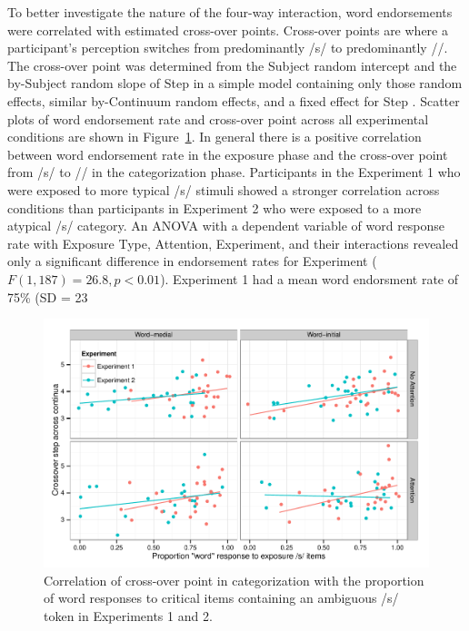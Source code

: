 To better investigate the nature of the four-way interaction, word endorsements were correlated with estimated cross-over points.  
Cross-over points are where a participant's perception switches from predominantly /s/ to predominantly /\textesh/.
The cross-over point was determined from the Subject random intercept and the by-Subject random slope of Step in a simple model containing only those random effects, similar by-Continuum random effects, and a fixed effect for Step \citep{Kleber2012}. 
Scatter plots of word endorsement rate and cross-over point across all experimental conditions are shown in Figure~\ref{fig:exp12xover}.
In general there is a positive correlation between word endorsement rate in the exposure phase and the cross-over point from /s/ to /\textesh/ in the categorization phase.
Participants in the Experiment 1 who were exposed to more typical /s/ stimuli showed a stronger correlation across conditions than participants in Experiment 2 who were exposed to a more atypical /s/ category.
An ANOVA with a dependent variable of word response rate with Exposure Type, Attention, Experiment, and their interactions revealed only a significant difference in endorsement rates for Experiment ($F(1, 187) = 26.8, p < 0.01$).  
Experiment 1 had a mean word endorsment rate of 75\% (SD = 23%

\begin{figure}[!ht]
\caption{Correlation of cross-over point in categorization with the proportion of word responses to critical items containing an ambiguous /s/ token in Experiments 1 and 2.}\label{fig:exp12xover}
\begin{center}
\includegraphics[width=\textwidth]{graphs/exp12_xoverwordresp}
\end{center}
\end{figure} 

